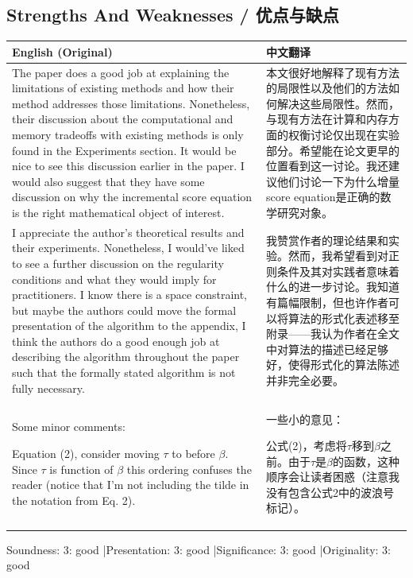 \documentclass[10pt,a4paper]{article}
\begin{document}
\subsection{Strengths And Weaknesses / 优点与缺点}

\begin{longtable}{L{0.48\textwidth}|L{0.48\textwidth}}
\hline
\textbf{English (Original)} & \textbf{中文翻译} \\
\hline
The paper does a good job at explaining the limitations of existing methods and how their method addresses those limitations. Nonetheless, their discussion about the computational and memory tradeoffs with existing methods is only found in the Experiments section. It would be nice to see this discussion earlier in the paper. I would also suggest that they have some discussion on why the incremental score equation is the right mathematical object of interest.
&
本文很好地解释了现有方法的局限性以及他们的方法如何解决这些局限性。然而，与现有方法在计算和内存方面的权衡讨论仅出现在实验部分。希望能在论文更早的位置看到这一讨论。我还建议他们讨论一下为什么增量score equation是正确的数学研究对象。 \\
\hline
I appreciate the author's theoretical results and their experiments. Nonetheless, I would've liked to see a further discussion on the regularity conditions and what they would imply for practitioners. I know there is a space constraint, but maybe the authors could move the formal presentation of the algorithm to the appendix, I think the authors do a good enough job at describing the algorithm throughout the paper such that the formally stated algorithm is not fully necessary.
&
我赞赏作者的理论结果和实验。然而，我希望看到对正则条件及其对实践者意味着什么的进一步讨论。我知道有篇幅限制，但也许作者可以将算法的形式化表述移至附录——我认为作者在全文中对算法的描述已经足够好，使得形式化的算法陈述并非完全必要。 \\
\hline
Some minor comments:

Equation (2), consider moving $\tau$ to before $\beta$. Since $\tau$ is function of $\beta$ this ordering confuses the reader (notice that I'm not including the tilde in the notation from Eq. 2).
&
一些小的意见：

公式(2)，考虑将$\tau$移到$\beta$之前。由于$\tau$是$\beta$的函数，这种顺序会让读者困惑（注意我没有包含公式2中的波浪号标记）。 \\
\hline
\end{longtable}

\noindent Soundness: 3: good \quad|\quad Presentation: 3: good \quad|\quad Significance: 3: good \quad|\quad Originality: 3: good
\end{document}
